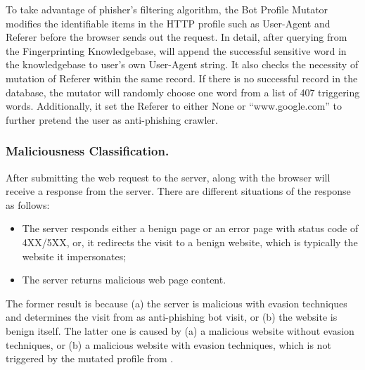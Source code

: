 To take advantage of phisher's filtering algorithm, the Bot Profile Mutator modifies the identifiable items in the HTTP profile such as User-Agent and Referer before the browser sends out the request.
In detail, after querying from the Fingerprinting Knowledgebase, \spartacus will append the successful sensitive word in the knowledgebase to user's own User-Agent string.
It also checks the necessity of mutation of Referer within the same record.
If there is no successful record in the database,
the mutator will randomly choose one word from a list of 407 triggering words.
Additionally, it set the Referer to either None or ``www.google.com'' to further pretend the user as anti-phishing crawler.


\subsubsection{Maliciousness Classification.}
After submitting the web request to the server, \spartacus along with the browser will receive a response from the server.
There are different situations of the response as follows:

\begin{itemize}
    \item The server responds either a benign page or an error page with status code of 4XX/5XX, or, it redirects the visit to a benign website, which is typically the website it impersonates;
    \item The server returns malicious web page content.
\end{itemize}


The former result is because (a) the server is malicious with evasion techniques and determines the visit from \spartacus as anti-phishing bot visit, or (b) the website is benign itself.
The latter one is caused by (a) a malicious website without evasion techniques, or (b) a malicious website with evasion techniques, which is not triggered by the mutated profile from \spartacus.

